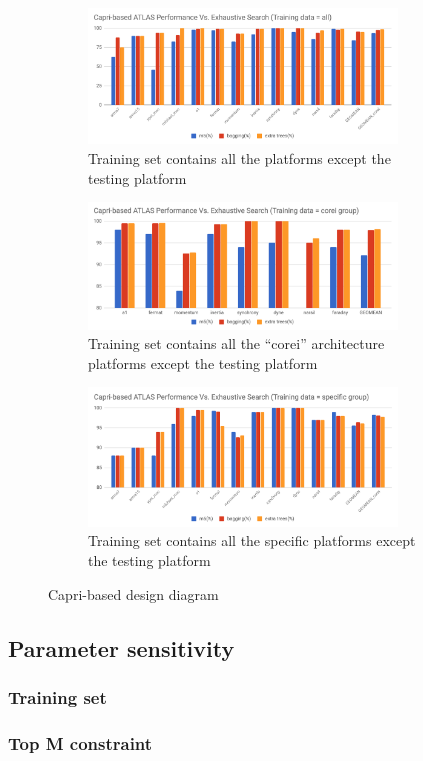   \begin{figure}[tbhp]
    \centering
    \begin{subfigure}[b]{1.0\linewidth}
      \centering
      \includegraphics[width=0.9\textwidth]{images/all_perf.png}
      \caption{Training set contains all the platforms except the testing platform}
      \label{fig:all_perf}
    \end{subfigure}
    \begin{subfigure}[b]{1.0\linewidth}
      \centering
      \includegraphics[width=0.9\textwidth]{images/corei_perf.png}
      \caption{Training set contains all the ``corei'' architecture platforms except the testing platform}
      \label{fig:corei_perf}
    \end{subfigure}
    \begin{subfigure}[b]{1.0\linewidth}
      \centering
      \includegraphics[width=0.9\textwidth]{images/specific_perf.png}
      \caption{Training set contains all the specific platforms except the testing platform}
      \label{fig:specific_perf}
    \end{subfigure}
  \caption{Capri-based \atl design diagram}
  \end{figure}

  \subsection{Parameter sensitivity}
  \label{sec:parametersensitivity}

    \subsubsection{Training set}
    \label{sec:training_set}

    \subsubsection{Top M constraint}
    \label{sec:top_m}
